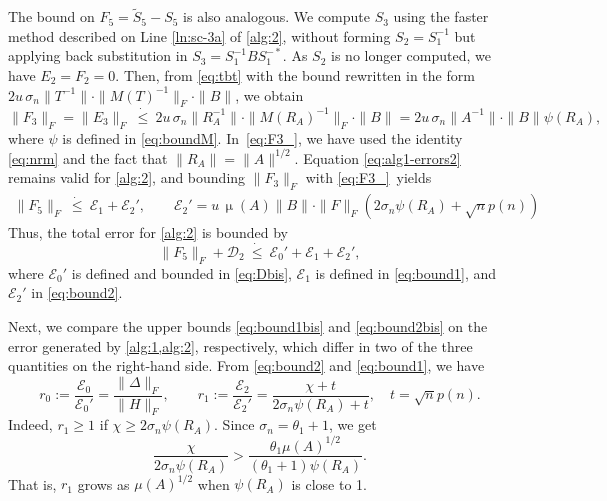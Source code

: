\documentclass[DIV=14]{scrartcl}
\newcommand\ledot{~\dot{\le}~}
\theoremstyle{thmstyletwo}
\theoremstyle{definition}
\numberwithin{equation}{section}
\newcommand{\wt}{\widetilde}
\renewcommand{\Delta}{\varDelta}
\newcommand{\deq}{\ensuremath{:=}}
\DeclareMathOperator{\cond}{\mu}
\begin{document}
{The bound on $F_5=\wt S_5-S_5$ is also analogous.
We compute $S_3$ using the faster method described on Line \ref{ln:sc-3a} of \cref{alg:2}, without forming
$S_2=S_1^{-1}$ but applying back substitution in
$S_3=S_1^{-1}BS_1^{-*}$.
As $S_2$ is no longer computed, we have $E_2=F_2=0$.
Then, from \eqref{eq:tbt} with the bound rewritten in the form $2u\,\sigma_n\|T^{-1}\|\cdot\|M(T)^{-1}\|_F\cdot\|B\|$, we obtain
\begin{equation}\label{eq:F3_}
\|F_3\|_F=\|E_3\|_F\ledot 2 u\,\sigma_n\|R_A^{-1}\|\cdot\|M(R_A)^{-1}\|_F\cdot \|B\|=
2u\,\sigma_n \|A^{-1}\|\cdot \|B\|\psi(R_A),
\end{equation}
where $\psi$ is defined in \eqref{eq:boundM}.
In~\eqref{eq:F3_}, we have used the identity \eqref{eq:nrm} and the fact that $\|R_A\|=\|A\|^{1/2}$.
Equation \eqref{eq:alg1-errors2} remains valid for \cref{alg:2}, and bounding $\|F_3\|_F$ with \eqref{eq:F3_}~yields
\begin{equation}\label{eq:bound2}
\begin{split}
\|F_5\|_F\ledot
\mathcal E_1+\mathcal E_2', \qquad
\mathcal E_2'= u\,\cond(A)  \|B\|
\cdot\|F\|_F( 2\sigma_n\psi(R_A) +\sqrt n p(n))
\end{split}
\end{equation}
Thus, the total error for \cref{alg:2} is bounded by
\begin{equation}\label{eq:bound2bis}
\|F_5\|_F+\mathcal D_2\ledot\mathcal E_0'+\mathcal E_1+\mathcal E_2',
\end{equation}
where $\mathcal E_0'$ is defined and bounded in \eqref{eq:Dbis}, $\mathcal E_1$ is defined in \eqref{eq:bound1}, and $\mathcal E_2'$ in \eqref{eq:bound2}.

Next, we compare the upper bounds \eqref{eq:bound1bis} and \eqref{eq:bound2bis} on the error generated by \cref{alg:1,alg:2}, respectively, which differ in two of the three quantities on the right-hand side. From \eqref{eq:bound2} and \eqref{eq:bound1}, we have
\begin{equation*}
    r_0 \deq{} \frac{\mathcal E_0}{\mathcal E_0'} = \frac{\|\Delta\|_F}{\|H\|_F},
    \qquad
    r_1 \deq{} \frac{\mathcal E_2}{\mathcal E_2'}
    =\frac{\chi+t}{2\sigma_n\psi(R_A)+t},\quad t=\sqrt n p(n).
\end{equation*}
Indeed, $r_1\ge 1$ if $\chi\ge 2\sigma_n\psi(R_A)$.
  Since $\sigma_n=\theta_1+1$, we get
\[
\frac {\chi}{2\sigma_n\psi(R_A)}>\frac{\theta_1\mu(A)^{1/2}}{(\theta_1+1)\psi(R_A)}.
\]
That is, $r_1$ grows as $\mu(A)^{1/2}$ when $\psi(R_A)$ is close to 1.

}
\end{document}
